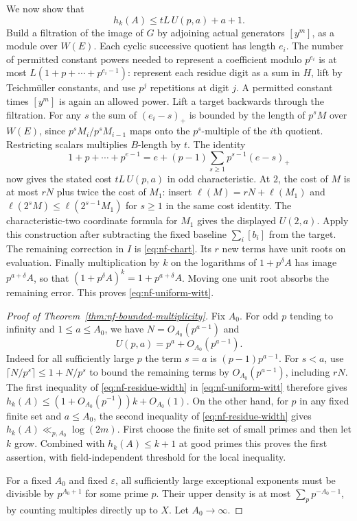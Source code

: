\documentclass[11pt,letterpaper]{article}
\theoremstyle{definition}
\numberwithin{equation}{section}
\begin{document}
We now show that
\begin{equation}\label{eq:nf-uniform-witt}
 h_k(A)\le tL\,U(p,a)+a+1.
\end{equation}
Build a filtration of the image of $G$ by adjoining actual generators
$[y^m]$, as a module over $W(E)$. Each cyclic successive quotient has
length $e_i$. The number of permitted constant powers needed to
represent a coefficient modulo $p^{e_i}$ is at most
$L(1+p+\cdots+p^{e_i-1})$: represent each residue digit as a sum in
$H$, lift by Teichm\"uller constants, and use $p^j$ repetitions at
digit $j$. A permitted constant times $[y^m]$ is again an allowed
power. Lift a target backwards through the filtration. For any $s$
the sum of $(e_i-s)_+$ is bounded by the length of $p^sM$ over
$W(E)$, since $p^sM_i/p^sM_{i-1}$ maps onto the $p^s$-multiple
of the $i$th quotient. Restricting scalars multiplies $B$-length by
$t$. The identity
\[
 1+p+\cdots+p^{e-1}
  = e+(p-1)\sum_{s\ge1}p^{s-1}(e-s)_+
\]
now gives the stated cost $tL\,U(p,a)$ in odd characteristic.
At $2$, the cost of $M$ is at most $rN$ plus twice the cost of $M_1$:
insert $\ell(M)=rN+\ell(M_1)$ and
$\ell(2^sM)\le\ell(2^{s-1}M_1)$ for $s\ge1$ in the same
cost identity. The characteristic-two coordinate formula for $M_1$
gives the displayed $U(2,a)$. Apply this construction after
subtracting the fixed baseline $\sum_i[b_i]$ from the target. The
remaining correction in $I$ is \eqref{eq:nf-chart}. Its $r$ new
terms have unit roots on evaluation. Finally multiplication by
$k$ on the logarithms of $1+p^\delta A$ has image
$p^{a+\delta}A$, so that $(1+p^\delta A)^k=1+p^{a+\delta}A$.
Moving one unit root absorbs the remaining error. This proves
\eqref{eq:nf-uniform-witt}.

\begin{proof}[Proof of Theorem~\ref{thm:nf-bounded-multiplicity}]
Fix $A_0$. For odd $p$ tending to infinity and $1\le a\le A_0$,
we have $N=O_{A_0}(p^{a-1})$ and
\[
 U(p,a)=p^a+O_{A_0}(p^{a-1}).
\]
Indeed for all sufficiently large $p$ the term $s=a$ is
$(p-1)p^{a-1}$. For $s<a$, use $\lceil N/p^s\rceil\le1+N/p^s$
to bound the remaining terms by $O_{A_0}(p^{a-1})$, including
$rN$. The first inequality of \eqref{eq:nf-residue-width} in
\eqref{eq:nf-uniform-witt} therefore gives
$h_k(A)\le(1+O_{A_0}(p^{-1}))k+O_{A_0}(1)$. On the other hand,
for $p$ in any fixed finite set and $a\le A_0$, the second
inequality of \eqref{eq:nf-residue-width} gives
$h_k(A)\ll_{p,A_0}\log(2m)$. First choose the finite set of small
primes and then let $k$ grow. Combined with $h_k(A)\le k+1$
at good primes this proves the first assertion, with field-independent
threshold for the local inequality.

For a fixed $A_0$ and fixed $\varepsilon$, all sufficiently large
exceptional exponents must be divisible by $p^{A_0+1}$ for some
prime $p$. Their upper density is at most
$\sum_p p^{-A_0-1}$, by counting multiples directly up to $X$.
Let $A_0\to\infty$.
\end{proof}
\end{document}
